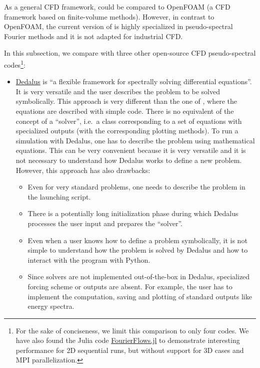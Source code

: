 \documentclass{../jors}
\begin{document}

As a general CFD framework,  could be compared to OpenFOAM (a CFD
framework based on finite-volume methods).
%
However, in contrast to OpenFOAM, the current version of  is highly
specialized in pseudo-spectral Fourier methods and it is not adapted for
industrial CFD.

In this subsection, we compare  with three other open-source CFD
pseudo-spectral codes\footnote{For the sake of conciseness, we limit this
comparison to only four codes. We have also found the Julia code
\href{https://github.com/FourierFlows/FourierFlows.jl}{FourierFlows.jl} to
demonstrate interesting performance for 2D sequential runs, but without support
for 3D cases and MPI parallelization.}:
\begin{itemize}
\item \href{http://dedalus-project.org/}{Dedalus} \citep{burns_dedalus} is ``a
flexible framework for spectrally solving differential equations''. It is very
versatile and the user describes the problem to be solved symbolically.
%
This approach is very different than the one of , where the
equations are described with simple \Numpy code.  There is no equivalent of the
 concept of a ``solver'', i.e.\ a class corresponding to a set of
equations with specialized outputs (with the corresponding plotting methods).  To
run a simulation with Dedalus, one has to describe the problem using mathematical
equations.  This can be very convenient because it is very versatile and it is not
necessary to understand how Dedalus works to define a new problem. However, this
approach has also drawbacks:
\begin{itemize}
\item Even for very standard problems, one needs to describe the problem in the
launching script.
\item There is a potentially long initialization phase during which Dedalus
processes the user input and prepares the ``solver''.
\item Even when a user knows how to define a problem symbolically, it is not
simple to understand how the problem is solved by Dedalus and how to interact with
the program with Python.
\item Since solvers are not implemented out-of-the-box in Dedalus,
specialized forcing scheme or outputs are absent. For example, the user has to
implement the computation, saving and plotting of standard outputs like energy
spectra.
\end{itemize}


\end{itemize}
\end{document}
